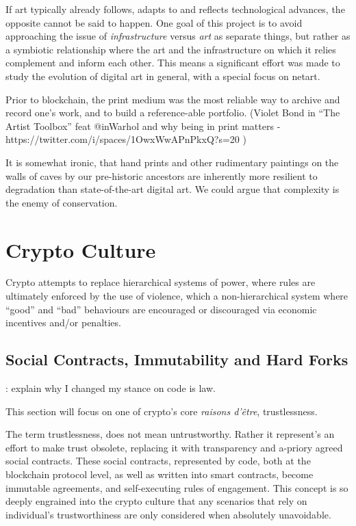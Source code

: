 If art typically already follows, adapts to and reflects technological advances, the opposite cannot be said to happen. One goal of this project is to avoid approaching the issue of \emph{infrastructure} versus \emph{art} as separate things, but rather as a symbiotic relationship where the art and the infrastructure on which it relies complement and inform each other. This means a significant effort was made to study the evolution of digital art in general, with a special focus on netart. 

Prior to blockchain, the print medium was the most reliable way to archive and record one's work, and to build a reference-able portfolio. (Violet Bond in ``The Artist Toolbox'' feat @inWarhol and why being in print matters - https://twitter.com/i/spaces/1OwxWwAPnPkxQ?s=20 )

It is somewhat ironic, that hand prints and other rudimentary paintings on the walls of caves by our pre-historic ancestors are inherently more resilient to degradation than state-of-the-art digital art. We could argue that complexity is the enemy of conservation.


\section{Crypto Culture}


Crypto attempts to replace hierarchical systems of power, where rules are ultimately enforced by the use of violence, which a non-hierarchical system where ``good'' and ``bad'' behaviours are encouraged or discouraged via economic incentives and/or penalties.



\subsection{Social Contracts, Immutability and Hard Forks}


\todo : explain why I changed my stance on code is law.

This section will focus on one of crypto's core \emph{raisons d'être}, trustlessness.

The term trustlessness, does not mean untrustworthy. Rather it represent's an effort to make trust obsolete, replacing it with transparency and a-priory agreed social contracts. These social contracts, represented by code, both at the blockchain protocol level, as well as written into smart contracts, become immutable agreements, and self-executing rules of engagement. This concept is so deeply engrained into the crypto culture that any scenarios that rely on individual's trustworthiness are only considered when absolutely unavoidable.

